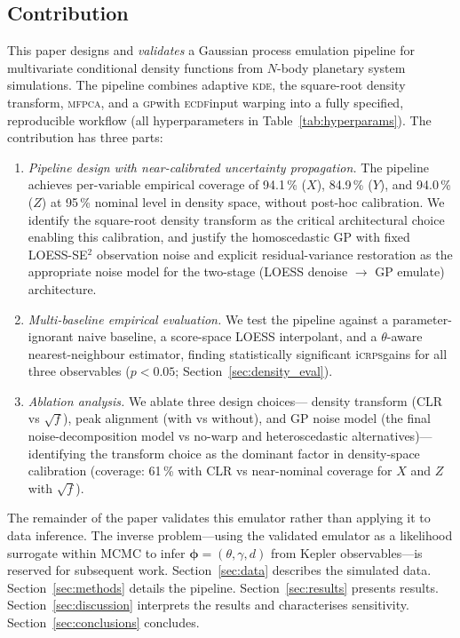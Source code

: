 \documentclass[12pt,a4paper]{article}
\newcommand{\GP}{\textsc{gp}}
\newcommand{\MFPCA}{\textsc{mfpca}}
\newcommand{\KDE}{\textsc{kde}}
\newcommand{\iCRPS}{i\textsc{crps}}
\newcommand{\ECDF}{\textsc{ecdf}}
\newcommand{\spar}{\theta}
\begin{document}
\subsection*{Contribution}

This paper designs and \emph{validates} a Gaussian process emulation
pipeline for multivariate conditional density functions from $N$-body
planetary system simulations.  The pipeline combines adaptive \KDE,
the square-root density transform, \MFPCA, and a \GP with \ECDF input
warping into a fully specified, reproducible workflow (all
hyperparameters in Table~\ref{tab:hyperparams}).  The contribution has
three parts:
\begin{enumerate}
  \item \emph{Pipeline design with near-calibrated uncertainty propagation.}
        The pipeline achieves per-variable empirical coverage of
        94.1\,\% ($X$), 84.9\,\% ($Y$), and 94.0\,\% ($Z$) at
        95\,\% nominal level in density space, without post-hoc
        calibration.
        We identify the square-root density transform as the critical
        architectural choice enabling this calibration, and justify the
        homoscedastic GP with fixed LOESS-SE$^2$ observation noise and
        explicit residual-variance restoration as the appropriate noise
        model for the two-stage (LOESS denoise $\to$ GP emulate)
        architecture.
  \item \emph{Multi-baseline empirical evaluation.}  We test the
        pipeline against a parameter-ignorant naive baseline, a
        score-space LOESS interpolant, and a $\spar$-aware
        nearest-neighbour estimator, finding statistically significant
        \iCRPS gains for all three observables ($p<0.05$;
        Section~\ref{sec:density_eval}).
  \item \emph{Ablation analysis.}  We ablate three design choices---
        density transform (CLR vs $\sqrt{f}$), peak alignment (with vs
        without), and GP noise model (the final noise-decomposition
        model vs no-warp and heteroscedastic alternatives)---identifying
        the transform choice as the dominant factor in density-space
        calibration (coverage: 61\,\% with CLR vs near-nominal coverage
        for $X$ and $Z$ with $\sqrt{f}$).
\end{enumerate}

The remainder of the paper validates this emulator rather than
applying it to data inference.  The inverse problem---using the
validated emulator as a likelihood surrogate within MCMC to infer
$\boldsymbol{\phi}=(\theta,\gamma,d)$ from Kepler observables---is reserved for subsequent work.
Section~\ref{sec:data} describes the simulated data.
Section~\ref{sec:methods} details the pipeline.
Section~\ref{sec:results} presents results.
Section~\ref{sec:discussion} interprets the results and characterises
sensitivity.  Section~\ref{sec:conclusions} concludes.
\end{document}
